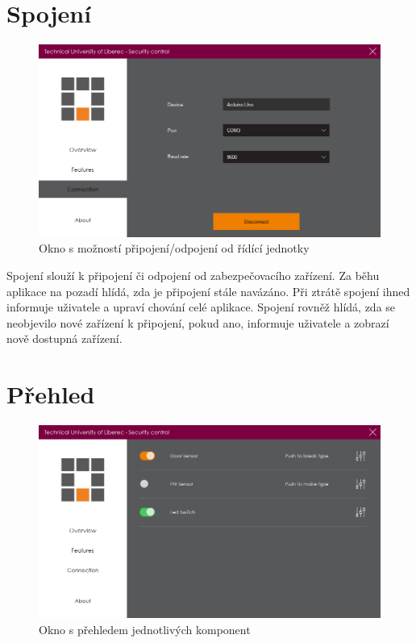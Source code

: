 \documentclass[FM,DP]{tulthesis}  %
\begin{document}
\section{Spojení}

\begin{figure}[H]
\begin{center}
\includegraphics[width=\textwidth]{images/connection.png}
\caption{Okno s možností připojení/odpojení od řídící jednotky}
\label{image}
\end{center}
\end{figure}

Spojení slouží k připojení či odpojení od zabezpečovacího zařízení. Za běhu aplikace na pozadí hlídá, zda je připojení stále navázáno. Při ztrátě spojení ihned informuje uživatele a upraví chování celé aplikace. Spojení rovněž hlídá, zda se neobjevilo nové zařízení k připojení, pokud ano, informuje uživatele a zobrazí nově dostupná zařízení.

\section{Přehled}

\begin{figure}[H]
\begin{center}
\includegraphics[width=\textwidth]{images/overview.png}
\caption{Okno s přehledem jednotlivých komponent}
\label{image}
\end{center}
\end{figure}
\end{document}
